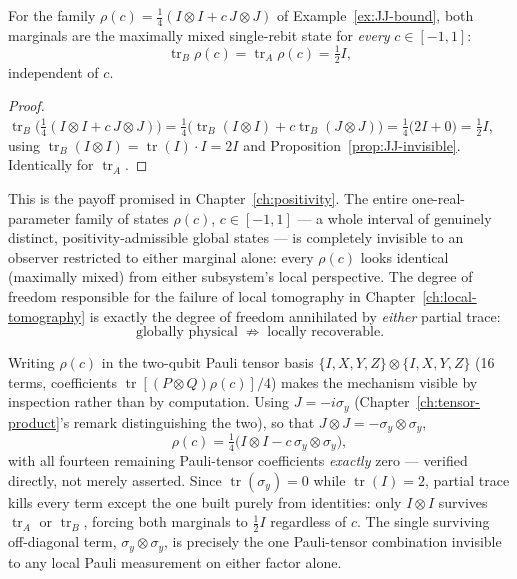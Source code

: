 \begin{corollary}
\label{cor:marginals-flat}
For the family $\rho(c) = \tfrac14(I\otimes I + c\,J\otimes J)$ of
Example~\ref{ex:JJ-bound}, both marginals are the maximally mixed single-rebit
state for \emph{every} $c \in [-1,1]$:
\begin{equation}
\operatorname{tr}_B\rho(c) = \operatorname{tr}_A\rho(c) = \tfrac12 I,
\end{equation}
independent of $c$.
\end{corollary}

\begin{proof}
$\operatorname{tr}_B\big(\tfrac14(I\otimes I + c\,J\otimes J)\big) =
\tfrac14\big(\operatorname{tr}_B(I\otimes I) + c\operatorname{tr}_B(J\otimes
J)\big) = \tfrac14\big(2I + 0\big) = \tfrac12 I$, using
$\operatorname{tr}_B(I\otimes I) = \operatorname{tr}(I)\cdot I = 2I$ and
Proposition~\ref{prop:JJ-invisible}. Identically for $\operatorname{tr}_A$.
\end{proof}

\begin{remark}
This is the payoff promised in Chapter~\ref{ch:positivity}. The entire
one-real-parameter family of states $\rho(c)$, $c\in[-1,1]$ — a whole interval
of genuinely distinct, positivity-admissible global states — is completely
invisible to an observer restricted to either marginal alone: every $\rho(c)$
looks identical (maximally mixed) from either subsystem's local perspective.
The degree of freedom responsible for the failure of local tomography in
Chapter~\ref{ch:local-tomography} is exactly the degree of freedom annihilated
by \emph{either} partial trace:
\begin{equation}
\boxed{\text{globally physical} \;\not\Rightarrow\; \text{locally
recoverable}.}
\end{equation}
\end{remark}

\begin{example}
Writing $\rho(c)$ in the two-qubit Pauli tensor basis $\{I,X,Y,Z\}\otimes
\{I,X,Y,Z\}$ (16 terms, coefficients $\operatorname{tr}[(P\otimes Q)\rho(c)]/4$)
makes the mechanism visible by inspection rather than by computation. Using
$J = -i\sigma_y$ (Chapter~\ref{ch:tensor-product}'s remark distinguishing the
two), so that $J\otimes J = -\sigma_y\otimes\sigma_y$,
\begin{equation}
\rho(c) = \tfrac14\big(I\otimes I - c\,\sigma_y\otimes\sigma_y\big),
\end{equation}
with all fourteen remaining Pauli-tensor coefficients \emph{exactly} zero —
verified directly, not merely asserted. Since $\operatorname{tr}(\sigma_y)=0$
while $\operatorname{tr}(I)=2$, partial trace kills every term except the one
built purely from identities: only $I\otimes I$ survives $\operatorname{tr}_A$
or $\operatorname{tr}_B$, forcing both marginals to $\tfrac12 I$ regardless of
$c$. The single surviving off-diagonal term, $\sigma_y\otimes\sigma_y$, is
precisely the one Pauli-tensor combination invisible to any local Pauli
measurement on either factor alone.
\end{example}

